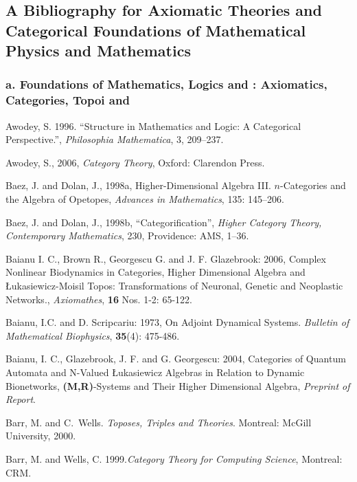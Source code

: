 \documentclass[12pt]{article}
\theoremstyle{plain}
\theoremstyle{definition}
\numberwithin{equation}{section}
\begin{document}
\subsection{A Bibliography for Axiomatic Theories and Categorical Foundations of Mathematical Physics and Mathematics}
 
\subsubsection{a. Foundations of Mathematics, Logics and 
: 
Axiomatics, Categories, Topoi and }

\begin{thebibliography}{99}

Awodey, S. 1996. ``Structure in Mathematics and Logic: A Categorical Perspective.'', {\em Philosophia Mathematica}, 3, 209--237. 

Awodey, S., 2006, {\em Category Theory}, Oxford: Clarendon Press.

Baez, J. and  Dolan, J., 1998a, Higher-Dimensional Algebra III. $n$-Categories and the Algebra of Opetopes, 
{\em Advances in Mathematics}, 135: 145--206.  

Baez, J. and  Dolan, J., 1998b, ``Categorification'', {\em Higher Category Theory, Contemporary Mathematics}, 230, Providence: AMS, 1--36. 

Baianu I. C., Brown R., Georgescu G. and J. F. Glazebrook: 2006, Complex Nonlinear Biodynamics in Categories, Higher Dimensional Algebra and \L{}ukasiewicz-Moisil Topos: Transformations of Neuronal, Genetic and Neoplastic Networks., 
\emph{Axiomathes}, \textbf{16} Nos. 1-2: 65-122.

Baianu, I.C. and D. Scripcariu: 1973, On Adjoint Dynamical Systems. 
\emph{Bulletin of Mathematical Biophysics}, \textbf{35}(4): 475-486.

Baianu, I. C., Glazebrook, J. F. and G. Georgescu: 2004, Categories of Quantum Automata and N-Valued \L ukasiewicz Algebras in Relation to Dynamic Bionetworks, \textbf{(M,R)}-Systems and Their Higher Dimensional Algebra,
\emph{Preprint of Report}.

Barr, M. and C.~Wells. {\em Toposes, Triples and Theories}. Montreal: McGill University, 2000.

Barr, M. and Wells, C. 1999.\emph{Category Theory for Computing Science}, Montreal: CRM. 
 

\end{thebibliography}
\end{document}
